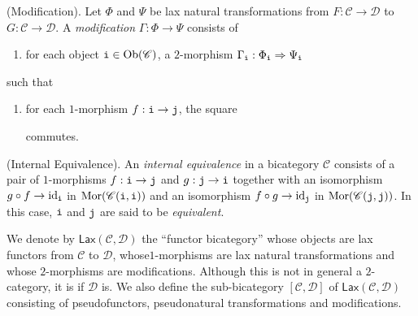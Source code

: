 \noindent\begin{definition}\textup{(Modification).} Let $\Phi$ and $\Psi$ be lax natural transformations from $F : \mathscr{C} \to \mathscr{D}$ to $G : \mathscr{C} \to \mathscr{D}$. A {\em modification} $\Gamma : \Phi \to \Psi$ consists of
\begin{enumerate}[label=$\bullet$, leftmargin=4\parindent]
\item for each object $\textup{\texttt{i}} \in \textup{Ob}(\mathscr{C})$, a $2$-morphism $\Gamma_{\textup{\texttt{i}}} : \Phi_{\textup{\texttt{i}}} \Rightarrow \Psi_{\textup{\texttt{i}}}$
\end{enumerate}
\noindent such that
\begin{enumerate}[label=$\bullet$, leftmargin=4\parindent]
\item for each $1$-morphism $f : \textup{\texttt{i}} \to \textup{\texttt{j}}$, the square
\begin{center}
\end{center}
commutes.\\
\end{enumerate}
\end{definition}

\noindent\begin{definition}\textup{(Internal Equivalence).} An {\em internal equivalence} in a bicategory $\mathscr{C}$ consists of a pair of $1$-morphisms $f : \textup{\texttt{i}} \to \textup{\texttt{j}}$ and $g : \textup{\texttt{j}} \to \textup{\texttt{i}}$ together with an isomorphism $g \circ f \to \textup{id}_{\textup{\texttt{i}}}$ in $\textup{Mor}(\mathscr{C}(\textup{\texttt{i}}, \textup{\texttt{i}}))$ and an isomorphism $f \circ g \to \textup{id}_{\textup{\texttt{j}}}$ in $\textup{Mor}(\mathscr{C}(\textup{\texttt{j}}, \textup{\texttt{j}}))$. In this case, $\textup{\texttt{i}}$ and $\textup{\texttt{j}}$ are said to be {\em equivalent}.\\
\end{definition}

\noindent We denote by $\textsf{Lax}(\mathscr{C}, \mathscr{D})$ the ``functor bicategory'' whose objects are lax functors from $\mathscr{C}$ to $\mathscr{D}$, whose\linebreak $1$-morphisms are lax natural transformations and whose $2$-morphisms are modifications. Although this is not in general a $2$-category, it is if $\mathscr{D}$ is. We also define the sub-bicategory $[\mathscr{C}, \mathscr{D}]$ of $\textsf{Lax}(\mathscr{C}, \mathscr{D})$ consisting of pseudofunctors, pseudonatural transformations and modifications.\\

